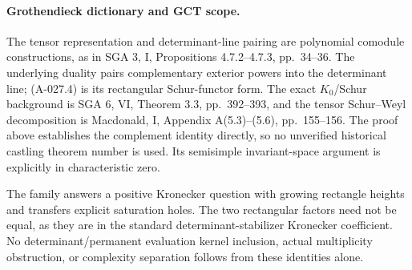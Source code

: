 \paragraph{Grothendieck dictionary and GCT scope.}
The tensor representation and determinant-line pairing are
polynomial comodule constructions, as in SGA 3, I,
Propositions 4.7.2--4.7.3, pp.~34--36. The underlying
duality pairs complementary exterior powers into the
determinant line; (A-027.4) is its rectangular Schur-functor
form. The exact $K_0$/Schur background is SGA 6, VI,
Theorem 3.3, pp.~392--393, and the tensor Schur--Weyl
decomposition is Macdonald, I, Appendix A(5.3)--(5.6),
pp.~155--156. The proof above establishes the complement
identity directly, so no unverified historical castling
theorem number is used. Its semisimple invariant-space
argument is explicitly in characteristic zero.

The family answers a positive Kronecker question with
growing rectangle heights and transfers explicit saturation
holes. The two rectangular factors need not be equal,
as they are in the standard determinant-stabilizer
Kronecker coefficient. No determinant/permanent evaluation
kernel inclusion, actual multiplicity obstruction, or
complexity separation follows from these identities alone.
